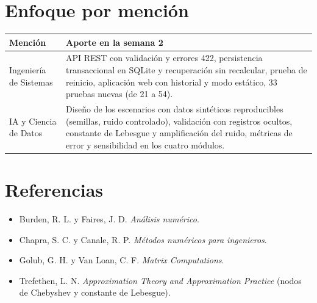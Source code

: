 \documentclass[11pt,letterpaper]{article}
\begin{document}
\section{Enfoque por mención}
{\small
\begin{longtable}{p{2.6cm}p{12.6cm}}
\toprule
\textbf{Mención} & \textbf{Aporte en la semana 2}\\
\midrule
Ingeniería de Sistemas & API REST con validación y errores 422, persistencia transaccional en SQLite y recuperación sin recalcular, prueba de reinicio, aplicación web con historial y modo estático, 33 pruebas nuevas (de 21 a 54).\\
IA y Ciencia de Datos & Diseño de los escenarios con datos sintéticos reproducibles (semillas, ruido controlado), validación con registros ocultos, constante de Lebesgue y amplificación del ruido, métricas de error y sensibilidad en los cuatro módulos.\\
\bottomrule
\end{longtable}}

\section*{Referencias}
\begin{itemize}
\item Burden, R. L. y Faires, J. D. \emph{Análisis numérico}.
\item Chapra, S. C. y Canale, R. P. \emph{Métodos numéricos para ingenieros}.
\item Golub, G. H. y Van Loan, C. F. \emph{Matrix Computations}.
\item Trefethen, L. N. \emph{Approximation Theory and Approximation Practice} (nodos de Chebyshev y constante de Lebesgue).
\end{itemize}
\end{document}
